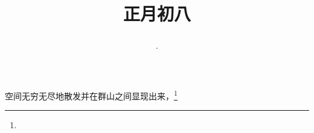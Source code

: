 \title{\date[d=17,m=2,y=2024][year:cn-y,年,month:cn,day:cn,日,·,weekday]·正月初八 }
空间无穷无尽地散发并在群山之间显现出来，\footnote{ }

